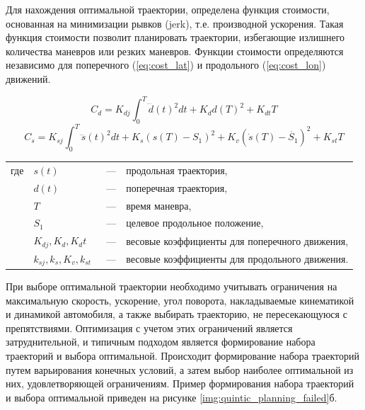 Для нахождения оптимальной траектории, определена функция стоимости, основанная на минимизации рывков
(jerk), т.е. производной ускорения. Такая функция стоимости позволит планировать траектории, избегающие
излишнего количества маневров или резких маневров. Функции стоимости определяются независимо для
поперечного (\ref{eq:cost_lat}) и продольного (\ref{eq:cost_lon}) движений.

\begin{equation}
    \label{eq:cost_lat}
    C_d = K_{dj} \int_{0}^{T}{\dddot{d}(t)^2dt} + K_d d(T)^2 + K_{dt} T
\end{equation}
\begin{equation}
    \label{eq:cost_lon}
    C_s = K_{sj} \int_{0}^{T}{\dddot{s}(t)^2dt} + K_s (s(T) - S_1)^2 + K_v (\dot{s}(T) - \dot{S_1})^2 + K_{st} T
\end{equation}

\noindent\begin{tabularx}{\linewidth}{lllX}
    где & $s(t)$         &~---& продольная траектория, \\
        & $d(t)$         &~---& поперечная траектория, \\
        & $T$            &~---& время маневра, \\
        & $S_1$   &~---& целевое продольное положение, \\
        & $K_{dj}, K_d, K_dt$ &~---& весовые коэффициенты для поперечного движения,\\
        & $k_{sj}, k_s, K_v, k_{st}$ &~---& весовые коэффициенты для продольного движения.
\end{tabularx}

При выборе оптимальной траектории необходимо учитывать ограничения на максимальную скорость, ускорение,
угол поворота, накладываемые кинематикой и динамикой автомобиля, а также выбирать траекторию, не
пересекающуюся с препятствиями. Оптимизация с учетом этих ограничений является затруднительной, и
типичным подходом является формирование набора траекторий и выбора оптимальной. Происходит формирование
набора траекторий путем варьирования конечных условий, а затем выбор наиболее оптимальной из них,
удовлетворяющей ограничениям. Пример формирования набора траекторий и выбора оптимальной приведен на
рисунке \ref{img:quintic_planning_failed}б.

